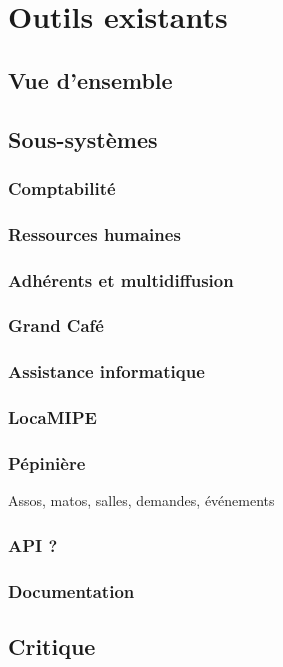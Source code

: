 \section{Outils existants}
\subsection{Vue d'ensemble}
\subsection{Sous-systèmes}
\subsubsection{Comptabilité}
\subsubsection{Ressources humaines}
\subsubsection{Adhérents et multidiffusion}
\subsubsection{Grand Café}
\subsubsection{Assistance informatique}
\subsubsection{LocaMIPE}
\subsubsection{Pépinière}
Assos, matos, salles, demandes, événements
\subsubsection{API ?}
\subsubsection{Documentation}
\subsection{Critique}
